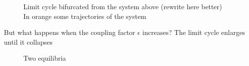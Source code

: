 \begin{figure}[!h]
        \caption{\label{fig:eq2D_cycle} Limit cycle bifurcated from the system above (rewrite here better) In orange some trajectories of the system}
\end{figure}


But what happens when the coupling factor $\epsilon$ increases? The limit cycle enlarges until it collapses 

\begin{figure}[!h]
        \caption{\label{fig:eq2D_mem}Two equilibria}
\end{figure}